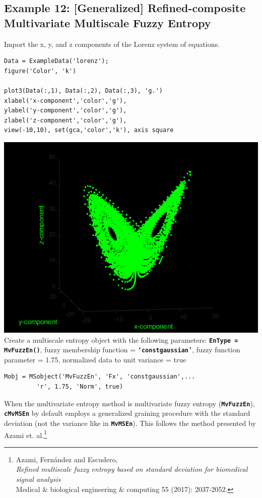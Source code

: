\documentclass[12pt, a4paper, titlepage, openany]{book}
\begin{document}
\subsection{\normalsize Example 12: \hspace{15mm} [Generalized] Refined-composite Multivariate Multiscale Fuzzy Entropy}
\noindent Import the x, y, and z components of the Lorenz system of equations.
\begin{verbatim}
Data = ExampleData('lorenz');
figure('Color', 'k')

plot3(Data(:,1), Data(:,2), Data(:,3), 'g.')
xlabel('x-component','color','g'), 
ylabel('y-component','color','g'), 
zlabel('z-component','color','g'), 
view(-10,10), set(gca,'color','k'), axis square
\end{verbatim}
\includegraphics[scale=.4]{lorenz.png}\newline \newline
Create a multiscale entropy object with the following parameters: \texttt{\textbf{EnType = MvFuzzEn()}}, fuzzy membership function = \texttt{\textbf{‘constgaussian’}}, fuzzy function parameter = 1.75, normalized data to unit variance = true
\begin{verbatim}
Mobj = MSobject('MvFuzzEn', 'Fx', 'constgaussian',...
		 'r', 1.75, 'Norm', true)
\end{verbatim}
\begin{tcolorbox}[colback=ehone!5, colframe=ehtwo!, title=\hypertarget{bidinote}{\textbf{ATTENTION}}, label={BiBox}]
When the multivariate entropy method is multivariate fuzzy entropy (\texttt{\textbf{MvFuzzEn}}), \texttt{\textbf{cMvMSEn}} by default employs a generalized graining procedure with the standard deviation (not the variance like in \texttt{\textbf{MvMSEn}}). This follows the method presented by Azami et. al.\footnote{Azami, Fernández and Escudero,\\ \indent\indent \emph{Refined multiscale fuzzy entropy based on standard deviation for biomedical signal analysis} \\ 
\indent\indent Medical \& biological engineering \& computing 55 (2017): 2037-2052.}
\end{tcolorbox}
\end{document}
